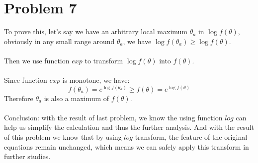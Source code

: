 \documentclass[12pt]{scrartcl}
\begin{document}
  \section*{Problem 7}
  
To prove this, let's say we have an arbitrary local maximum $\theta_a$ in $\log f(\theta)$, obviously in any small range around $\theta_a$, we have $\log f(\theta_a) \geq \log f(\theta)$.
\\
\\
Then we use function $exp$ to transform $\log f(\theta)$ into $f(\theta)$.
\\
\\
Since function $exp$ is monotone, we have:
\[f(\theta_a) = e^{\log f(\theta_a)} \geq f(\theta) = e^{\log f(\theta)}\]
Therefore $\theta_a$ is also a maximum of $f(\theta)$.
\\
\\
Conclusion: with the result of last problem, we know the using function $log$ can help us simplify the calculation and thus the further analysis. And with the result of this problem we know that by using $log$ transform, the feature of the original equations remain unchanged, which means we can safely apply this transform in further studies.
\end{document}
